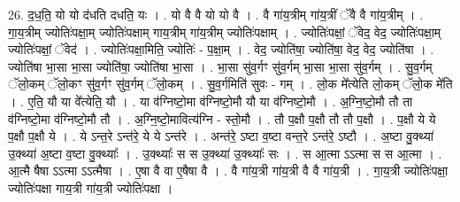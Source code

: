\documentclass[17pt]{extarticle}
\begin{document}
26. द॒ध॒ति॒ यो यो द॑धति दधति॒ यः । . यो वै वै यो यो वै । . वै गा॑य॒त्रीम् गा॑य॒त्रीं ॅवै वै गा॑य॒त्रीम् । . गा॒य॒त्रीम् ज्योतिः॑पक्षा॒म् ज्योतिः॑पक्षाम् गाय॒त्रीम् गा॑य॒त्रीम् ज्योतिः॑पक्षाम् । . ज्योतिः॑पक्षां॒ ॅवेद॒ वेद॒ ज्योतिः॑पक्षा॒म् ज्योतिः॑पक्षां॒ ॅवेद॑ । . ज्योतिः॑पक्षा॒मिति॒ ज्योतिः॑ - प॒क्षा॒म् । . वेद॒ ज्योति॑षा॒ ज्योति॑षा॒ वेद॒ वेद॒ ज्योति॑षा । . ज्योति॑षा भा॒सा भा॒सा ज्योति॑षा॒ ज्योति॑षा भा॒सा । . भा॒सा सु॑व॒र्गꣳ सु॑व॒र्गम् भा॒सा भा॒सा सु॑व॒र्गम् । . सु॒व॒र्गम् ॅलो॒कम् ॅलो॒कꣳ सु॑व॒र्गꣳ सु॑व॒र्गम् ॅलो॒कम् । . सु॒व॒र्गमिति॑ सुवः - गम् । . लो॒क मे᳚त्येति लो॒कम् ॅलो॒क मे॑ति । . ए॒ति॒ यौ या वे᳚त्येति॒ यौ । . या व॑ग्निष्टो॒मा व॑ग्निष्टो॒मौ यौ या व॑ग्निष्टो॒मौ । . अ॒ग्नि॒ष्टो॒मौ तौ ता व॑ग्निष्टो॒मा व॑ग्निष्टो॒मौ तौ । . अ॒ग्नि॒ष्टो॒मावित्य॑ग्नि - स्तो॒मौ । . तौ प॒क्षौ प॒क्षौ तौ तौ प॒क्षौ । . प॒क्षौ ये ये प॒क्षौ प॒क्षौ ये । . ये ऽन्त॒रे ऽन्त॑रे॒ ये ये ऽन्त॑रे । . अन्त॑रे॒ ऽष्टा व॒ष्टा वन्त॒रे ऽन्त॑रे॒ ऽष्टौ । . अ॒ष्टा वु॒क्थ्या॑ उ॒क्थ्या॑ अ॒ष्टा व॒ष्टा वु॒क्थ्याः᳚ । . उ॒क्थ्याः᳚ स स उ॒क्थ्या॑ उ॒क्थ्याः᳚ सः । . स आ॒त्मा ऽऽत्मा स स आ॒त्मा । . आ॒त्मै षैषा ऽऽत्मा ऽऽत्मैषा । . ए॒षा वै वा ए॒षैषा वै । . वै गा॑य॒त्री गा॑य॒त्री वै वै गा॑य॒त्री । . गा॒य॒त्री ज्योतिः॑पक्षा॒ ज्योतिः॑पक्षा गाय॒त्री गा॑य॒त्री ज्योतिः॑पक्षा । \newline
\end{document}
